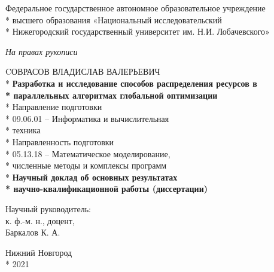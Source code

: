 \begin{titlepage}

  \begin{center}
    \fontsize{14pt}{0pt}

    Федеральное государственное автономное образовательное учреждение \\*
    высшего образования «Национальный исследовательский \\*
    Нижегородский государственный университет им. Н.И. Лобачевского»\\
  \end{center}

  \vspace{12pt}
  \vspace{25pt}

  \begin{center}
  \fontsize{14pt}{0pt}
  \textit{На правах рукописи\\}

  \vspace{12pt}

  CОВРАСОВ ВЛАДИСЛАВ ВАЛЕРЬЕВИЧ\\*
  \vspace{12pt}
  \vspace{25pt}
  \textbf{Разработка и исследование способов распределения ресурсов в\\*
  параллельных алгоритмах глобальной оптимизации}\\*
  \vspace{14pt}
  Направление подготовки\\*
  09.06.01 – Информатика и вычислительная\\*
  техника\\*
  \vspace{14pt}
  Направленность подготовки\\*
  05.13.18 – Математическое моделирование,\\*
  численные методы и комплексы программ\\*
  \vspace{14pt}
  \vspace{14pt}
  \textbf{Научный доклад об основных результатах\\*
  научно-квалификационной работы (диссертации)}
  \end{center}

  \vspace{40pt}


  \begin{flushright}
  Научный руководитель:\\
  к. ф.-м. н., доцент,\\
  Баркалов К. А.\\
  \end{flushright}

  \vspace{30pt}

  \vspace{\fill}

  \begin{center}
  Нижний Новгород \\*
  2021
  \end{center}

  \end{titlepage}
